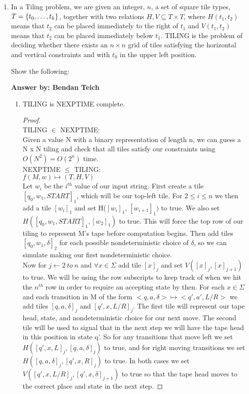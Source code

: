 \documentclass[12pt]{article}
\begin{document}
\begin{enumerate}
\begin{proof}
   \end{proof}

\item  %
In a Tiling problem, we are
given an integer, $n$, a set of square tile types, $T = \{ t_0, \ldots, t_k \}$, together with two
relations $H,V 
\subseteq T \times T$, where $H(t_1,t_2)$ means that $t_2$ can be placed immediately to the right of
$t_1$ and $V(t_1,t_2)$ means that $t_2$ can be placed immediately below $t_1$.  TILING is the
problem of deciding whether there exists an $n\times n$ grid of tiles satisfying the horizontal and
vertical constraints and with $t_0$ in the upper left position.



Show the following:

   {\bf Answer by: Bendan Teich} 

\begin{enumerate}
\item TILING is NEXPTIME complete.\\
\begin{proof}\\
	TILING $\in$ NEXPTIME:\\
	Given a value N with a binary representation of length n, we can guess a N x N tiling and check that all tiles satisfy our constraints using $O(N^2) = O(2^n)$ time.\\
	
	NEXPTIME $\leq$ TILING: \\ 
	$f(M, w) \mapsto (T, H, V)$ \\
	Let $w_i$ be the $i^{th}$ value of our input string.
	First create a tile $[q_0, w_1, START]_1$, which will be our top-left tile. For $2 \leq i \leq n$ we then add a tile $[w_{i}]_1$ and set H($[w_{i}]_1$, $[w_{i+1}]_1)$ to true. We also set $H([q_0, w_1, START]_1, [w_2]_1)$ to true.  This will force the top row of our tiling to represent M's tape before computation begins. Then add tiles  $[q_0, w_1, \delta]_2$ for each possible nondeterministic choice of $\delta$, so we can simulate making our first nondeterministic choice.\\
	
	Now for $j \gets 2\ to\ n$ and $\forall x \in \Sigma$ add tile $[x]_j$ and set $V([x]_j, [x]_{j+1})$ to true.  We will be using the row subscripts to keep track of when we hit the $n^{th}$ row in order to require an accepting state by then.  For each $x \in \Sigma$ and each transition in M of the form $<q, a, \delta> \mapsto <q', a', L/R>$ we add tiles $[q, a, \delta]_j$ and $[q', x, L/R]_j$.  The first tile will represent our tape head, state, and nondeterministic choice for our next move.  The second tile will be used to signal that in the next step we will have the tape head in this position in state q'.  So for any transitions that move left we set  $H([q',x,L]_j, [q, a, \delta]_j)$ to true, and for right moving transitions we set  $H([q, a, \delta]_j, [q',x,R]_j) $ to true.  In both cases we set $V([q',x,L/R]_j, [q', x, \delta]_{j+1})$ to true so that the tape head moves to the correct place and state in the next step.  
	

\end{proof}
\end{enumerate}
\end{enumerate}
\end{document}
